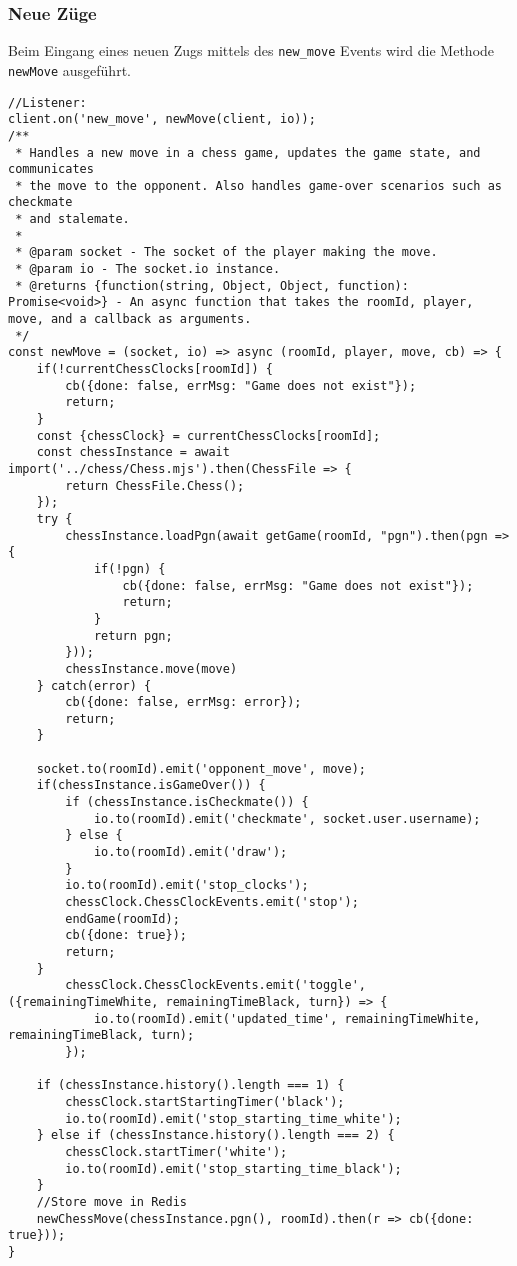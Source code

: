 \subsubsection{Neue Züge}
Beim Eingang eines neuen Zugs mittels des \verb|new_move| Events wird die Methode \verb|newMove| ausgeführt.
\begin{lstlisting}[style=codeStyle, caption={newMove Methode die beim Eingang eines neuen Zugs aufgerufen wird}, label={lst:newMove}]
//Listener:
client.on('new_move', newMove(client, io));
/**
 * Handles a new move in a chess game, updates the game state, and communicates
 * the move to the opponent. Also handles game-over scenarios such as checkmate
 * and stalemate.
 *
 * @param socket - The socket of the player making the move.
 * @param io - The socket.io instance.
 * @returns {function(string, Object, Object, function): Promise<void>} - An async function that takes the roomId, player, move, and a callback as arguments.
 */
const newMove = (socket, io) => async (roomId, player, move, cb) => {
    if(!currentChessClocks[roomId]) {
        cb({done: false, errMsg: "Game does not exist"});
        return;
    }
    const {chessClock} = currentChessClocks[roomId];
    const chessInstance = await import('../chess/Chess.mjs').then(ChessFile => {
        return ChessFile.Chess();
    });
    try {
        chessInstance.loadPgn(await getGame(roomId, "pgn").then(pgn => {
            if(!pgn) {
                cb({done: false, errMsg: "Game does not exist"});
                return;
            }
            return pgn;
        }));
        chessInstance.move(move)
    } catch(error) {
        cb({done: false, errMsg: error});
        return;
    }

    socket.to(roomId).emit('opponent_move', move);
    if(chessInstance.isGameOver()) {
        if (chessInstance.isCheckmate()) {
            io.to(roomId).emit('checkmate', socket.user.username);
        } else {
            io.to(roomId).emit('draw');
        }
        io.to(roomId).emit('stop_clocks');
        chessClock.ChessClockEvents.emit('stop');
        endGame(roomId);
        cb({done: true});
        return;
    }
        chessClock.ChessClockEvents.emit('toggle', ({remainingTimeWhite, remainingTimeBlack, turn}) => {
            io.to(roomId).emit('updated_time', remainingTimeWhite, remainingTimeBlack, turn);
        });

    if (chessInstance.history().length === 1) {
        chessClock.startStartingTimer('black');
        io.to(roomId).emit('stop_starting_time_white');
    } else if (chessInstance.history().length === 2) {
        chessClock.startTimer('white');
        io.to(roomId).emit('stop_starting_time_black');
    }
    //Store move in Redis
    newChessMove(chessInstance.pgn(), roomId).then(r => cb({done: true}));
}
\end{lstlisting}

